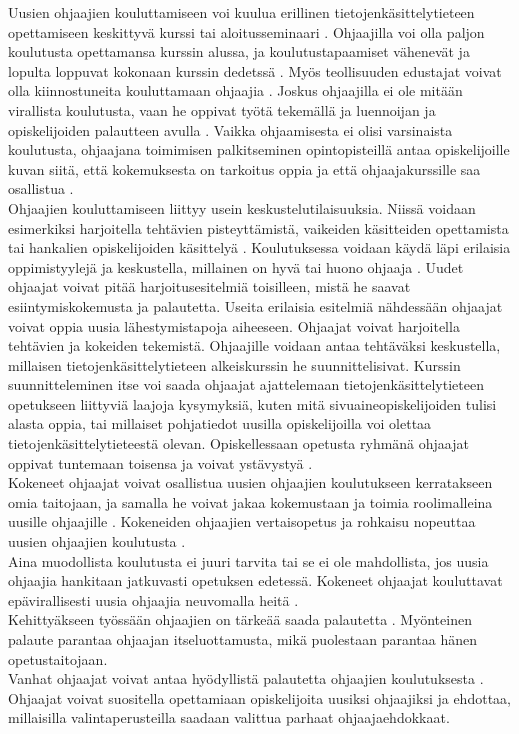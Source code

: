 \documentclass[finnish]{tktltiki2}
\theoremstyle{definition}
\theoremstyle{remark}
\begin{document}
Uusien ohjaajien kouluttamiseen voi kuulua erillinen tietojenkäsittelytieteen opettamiseen keskittyvä kurssi \cite{Reges88, Roberts95} tai aloitusseminaari \cite{Sperry08}. Ohjaajilla voi olla paljon koulutusta opettamansa kurssin alussa, ja koulutustapaamiset vähenevät ja lopulta loppuvat kokonaan kurssin dedetssä \cite{Roberts95}. Myös teollisuuden edustajat voivat olla kiinnostuneita kouluttamaan ohjaajia \cite{Morgan02}. Joskus ohjaajilla ei ole mitään virallista koulutusta, vaan he oppivat työtä tekemällä ja luennoijan ja opiskelijoiden palautteen avulla \cite{Shannon98, Vihavainen}. Vaikka ohjaamisesta ei olisi varsinaista koulutusta, ohjaajana toimimisen palkitseminen opintopisteillä antaa opiskelijoille kuvan siitä, että kokemuksesta on tarkoitus oppia ja että ohjaajakurssille saa osallistua \cite{Vikberg}.
\\
Ohjaajien kouluttamiseen liittyy usein keskustelutilaisuuksia. Niissä voidaan esimerkiksi harjoitella tehtävien pisteyttämistä, vaikeiden käsitteiden opettamista tai hankalien opiskelijoiden käsittelyä \cite{Reges03}. Koulutuksessa voidaan käydä läpi erilaisia oppimistyylejä ja keskustella, millainen on hyvä tai huono ohjaaja \cite{Kay95}. Uudet ohjaajat voivat pitää harjoitusesitelmiä toisilleen, mistä he saavat esiintymiskokemusta ja palautetta. Useita erilaisia esitelmiä nähdessään ohjaajat voivat oppia uusia lähestymistapoja aiheeseen. Ohjaajat voivat harjoitella tehtävien ja kokeiden tekemistä. Ohjaajille voidaan antaa tehtäväksi keskustella, millaisen tie\-to\-jen\-kä\-sit\-te\-ly\-tie\-teen alkeiskurssin he suunnittelisivat. Kurssin suunnitteleminen itse voi saada ohjaajat ajattelemaan tietojenkäsittelytieteen opetukseen liittyviä laajoja kysymyksiä, kuten mitä sivuaineopiskelijoiden tulisi alasta oppia, tai millaiset pohjatiedot uusilla opiskelijoilla voi olettaa tietojenkäsittelytieteestä olevan. Opiskellessaan opetusta ryhmänä ohjaajat oppivat tuntemaan toisensa ja voivat ystävystyä \cite{Roberts95}.
\\
Kokeneet ohjaajat voivat osallistua uusien ohjaajien koulutukseen kerratakseen omia taitojaan, ja samalla he voivat jakaa kokemustaan ja toimia roolimalleina uusille ohjaajille \cite{Reges88}. Kokeneiden ohjaajien vertaisopetus ja rohkaisu nopeuttaa uusien ohjaajien koulutusta \cite{Decker06}. 
\\
Aina muodollista koulutusta ei juuri tarvita tai se ei ole mahdollista, jos uusia ohjaajia hankitaan jatkuvasti opetuksen edetessä. Kokeneet ohjaajat kouluttavat epävirallisesti uusia ohjaajia neuvomalla heitä \cite{Kurhila11}. 
\\
Kehittyäkseen työssään ohjaajien on tärkeää saada palautetta \cite{Patitsas12, Patitsas12_3}. Myönteinen palaute parantaa ohjaajan itseluottamusta, mikä puolestaan parantaa hänen opetustaitojaan.
\\
Vanhat ohjaajat voivat antaa hyödyllistä palautetta ohjaajien koulutuksesta \cite{Decker06}. Ohjaajat voivat suositella opettamiaan opiskelijoita uusiksi ohjaajiksi ja ehdottaa, millaisilla valintaperusteilla saadaan valittua parhaat ohjaajaehdokkaat. 
\end{document}
